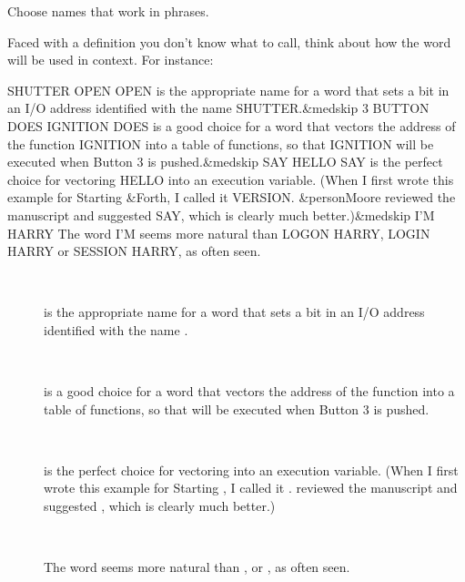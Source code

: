 %
\begin{tip}
Choose names that work in phrases.
\end{tip}
Faced with a definition you don't know what to call, think about how the
word will be used in context.  For instance:
\ifeightyfour
\begin{Code}[fontfamily=cmss,commandchars=\&\{\}]
SHUTTER OPEN
  OPEN is the appropriate name for a word that sets a
  bit in an I/O address identified with the name
  SHUTTER.&medskip
3 BUTTON DOES IGNITION
  DOES is a good choice for a word that vectors the
  address of the function IGNITION into a table of
  functions, so that IGNITION will be executed when
  Button 3 is pushed.&medskip
SAY HELLO
  SAY is the perfect choice for vectoring HELLO into an
  execution variable.  (When I first wrote this example
  for Starting &Forth{}, I called it VERSION. &person{Moore}
  reviewed the manuscript and suggested SAY, which is
  clearly much better.)&medskip
I'M HARRY
  The word I'M seems more natural than LOGON HARRY,
  LOGIN HARRY or SESSION HARRY, as often seen.
\end{Code}
\else
\begin{description}
\item[]~

   is the appropriate name for a word that sets a
  bit in an I/O address identified with the name
  .
\item[]~

   is a good choice for a word that vectors the
  address of the function  into a table of
  functions, so that  will be executed when
  Button 3 is pushed.
\item[]~

   is the perfect choice for vectoring  into an
  execution variable.  (When I first wrote this example
  for Starting \Forth{}, I called it . 
  reviewed the manuscript and suggested , which is
  clearly much better.)
\item[]~

  The word  seems more natural than ,
   or , as often seen.
\end{description}
\fi

